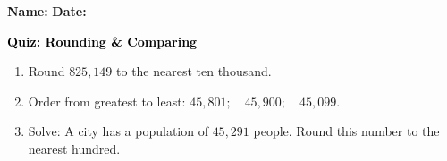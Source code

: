 \documentclass[12pt, letterpaper, fleqn]{article}
\begin{document}
\textbf{Name:} \underline{\hspace{5cm}}
\hfill
\textbf{Date:} \underline{\hspace{3cm}}\\

\begin{tcolorbox}[colback=customteal!20]
    \large\textcolor{black}{\textbf{Quiz: Rounding & Comparing}}
\end{tcolorbox}
\begin{enumerate}[itemsep=3.5cm, leftmargin=0.6cm]
\item Round $825,149$ to the nearest ten thousand.
\vspace{3cm}
\item Order from greatest to least: $45,801; \quad 45,900; \quad 45,099$.
\vspace{3cm}
\item Solve: A city has a population of $45,291$ people. Round this number to the nearest hundred.
\end{enumerate}
\end{document}
